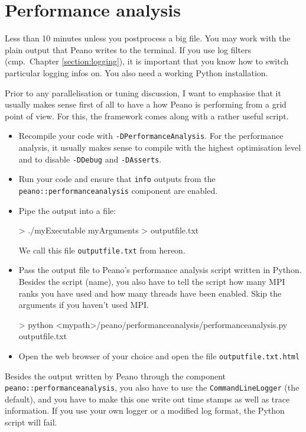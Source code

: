 \section{Performance analysis}


\chapterDescription
  {
    Less than 10 minutes unless you postprocess a big file.
  }
  {
    You may work with the plain output that Peano writes to the terminal. If you
    use log filters (cmp.~Chapter \ref{section:logging}), it is important that
    you know how to switch particular logging infos on. You also need a working
    Python installation.
  }

\noindent
Prior to any parallelisation or tuning discussion, I want to emphasise that it
usually makes sense first of all to have a how Peano is performing from a grid
point of view. For this, the framework comes along with a rather useful script.

\begin{itemize}
  \item Recompile your code with \texttt{-DPerformanceAnalysis}. For the
    performance analysis, it usually makes sense to compile with the highest
    optimisation level and to disable \texttt{-DDebug} and \texttt{-DAsserts}.
  \item Run your code and ensure that \texttt{info} outputs from the
    \texttt{peano::performanceanalysis} component are enabled.
  \item Pipe the output into a file:
    \begin{code}
> ./myExecutable myArguments > outputfile.txt
    \end{code} 
    We call this file \texttt{outputfile.txt} from hereon.
  \item Pass the output file to Peano's performance analysis script written in
  Python. Besides the script (name), you also have to tell the script how many 
    MPI ranks you have used and how many threads have been enabled. Skip
    the arguments if you haven't used MPI.
    \begin{code}
> python <mypath>/peano/performanceanalysis/performanceanalysis.py outputfile.txt
    \end{code} 
  \item Open the web browser of your choice and open the file
  \texttt{outputfile.txt.html}
\end{itemize}

\begin{remark}
Besides the output written by Peano through the component
\texttt{peano::performanceanalysis}, you also have to use the
\texttt{CommandLineLogger} (the default), and you have to make this one write
out time stamps as well as trace information. If you use your own logger or a
modified log format, the Python script will fail.
\end{remark}

